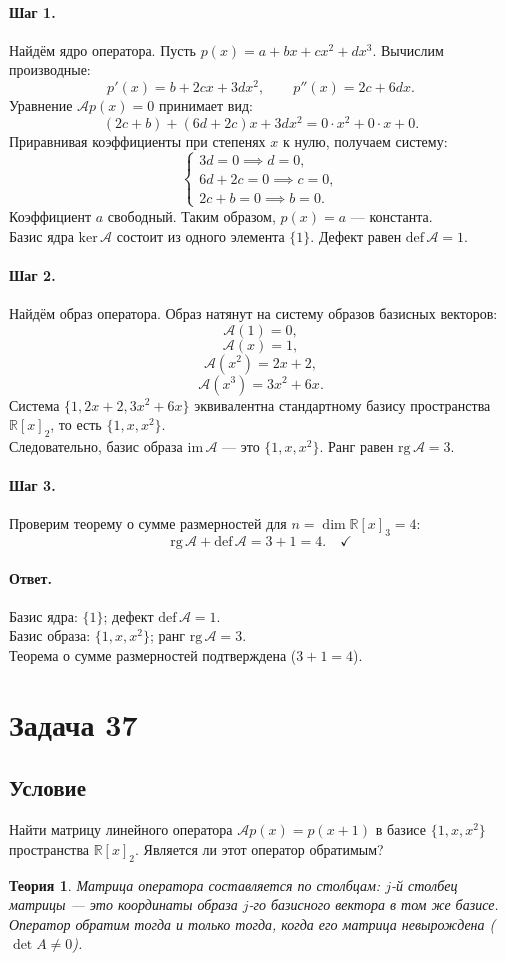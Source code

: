 \documentclass[12pt,a4paper]{article}
\theoremstyle{solution}
\newtheorem*{theory}{Теория}
\newcommand{\task}[1]{\newpage\section*{Задача #1}}
\newcommand{\answer}{\paragraph{Ответ.}}
\newcommand{\step}[1]{\paragraph{Шаг #1.}}
\newcommand{\R}{\mathbb{R}}
\begin{document}
\step{1} Найдём ядро оператора. Пусть $p(x) = a + bx + cx^2 + dx^3$. Вычислим производные:
\[
p'(x) = b + 2cx + 3dx^2, \qquad p''(x) = 2c + 6dx.
\]
Уравнение $\mathcal{A}p(x) = 0$ принимает вид:
\[
(2c + b) + (6d + 2c)x + 3dx^2 = 0 \cdot x^2 + 0 \cdot x + 0.
\]
Приравнивая коэффициенты при степенях $x$ к нулю, получаем систему:
\[
\begin{cases}
3d = 0 \implies d = 0, \\
6d + 2c = 0 \implies c = 0, \\
2c + b = 0 \implies b = 0.
\end{cases}
\]
Коэффициент $a$ свободный. Таким образом, $p(x) = a$ — константа. \\
Базис ядра $\mathrm{ker}\,\mathcal{A}$ состоит из одного элемента $\{1\}$. Дефект равен $\mathrm{def}\,\mathcal{A} = 1$.

\step{2} Найдём образ оператора. Образ натянут на систему образов базисных векторов:
\[
\mathcal{A}(1) = 0,
\]
\[
\mathcal{A}(x) = 1,
\]
\[
\mathcal{A}(x^2) = 2x + 2,
\]
\[
\mathcal{A}(x^3) = 3x^2 + 6x.
\]
Система $\{1, 2x+2, 3x^2+6x\}$ эквивалентна стандартному базису пространства $\R[x]_2$, то есть $\{1, x, x^2\}$. \\
Следовательно, базис образа $\mathrm{im}\,\mathcal{A}$ — это $\{1, x, x^2\}$. Ранг равен $\mathrm{rg}\,\mathcal{A} = 3$.

\step{3} Проверим теорему о сумме размерностей для $n = \dim \R[x]_3 = 4$:
\[
\mathrm{rg}\,\mathcal{A} + \mathrm{def}\,\mathcal{A} = 3 + 1 = 4. \quad\checkmark
\]

\answer
Базис ядра: $\{1\}$; дефект $\mathrm{def}\,\mathcal{A} = 1$.\\
Базис образа: $\{1, x, x^2\}$; ранг $\mathrm{rg}\,\mathcal{A} = 3$.\\
Теорема о сумме размерностей подтверждена ($3 + 1 = 4$).

\task{37}
\subsection*{Условие}
Найти матрицу линейного оператора $\mathcal{A}p(x) = p(x + 1)$ в базисе $\{1, x, x^2\}$ пространства $\R[x]_2$. Является ли этот оператор обратимым?

\begin{theory}
Матрица оператора составляется по столбцам: $j$-й столбец матрицы — это координаты образа $j$-го базисного вектора в том же базисе. Оператор обратим тогда и только тогда, когда его матрица невырождена ($\det A \neq 0$).
\end{theory}
\end{document}
